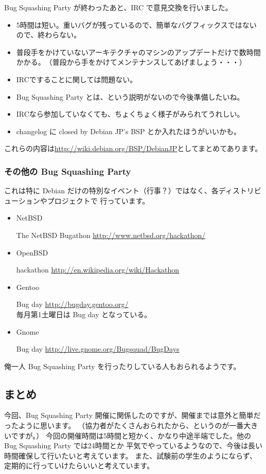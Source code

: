 \documentclass[mingoth,a4paper]{jsarticle}
\begin{document}
 Bug Squashing Party が終わったあと、IRC で意見交換を行いました。

\begin{itemize}

    \item 5時間は短い。重いバグが残っているので、簡単なバグフィックスではないので、終わらない。
    \item 普段手をかけていないアーキテクチャのマシンのアップデートだけで数時間かかる。　（普段から手をかけてメンテナンスしてあげましょう・・・）
    \item IRCですることに関しては問題ない。
    \item Bug Squashing Party とは、という説明がないので今後準備したいね。
    \item IRCなら参加していなくても、ちょくちょく様子がみられてうれしい。
    \item changelog に closed by Debian JP's BSP とか入れたほうがいいかも。

\end{itemize}

 これらの内容は\url{http://wiki.debian.org/BSP/DebianJP}としてまとめてあります。

\subsubsection{その他の Bug Squashing Party}
これは特に Debian だけの特別なイベント（行事？）ではなく、各ディストリビューションやプロジェクトで
行っています。
\begin{itemize}
	\item NetBSD
		
		The NetBSD Bugathon \url{http://www.netbsd.org/hackathon/} 
	\item OpenBSD

		hackathon \url{http://en.wikipedia.org/wiki/Hackathon}
	\item Gentoo

		Bug day \url{http://bugday.gentoo.org/} \\
		毎月第1土曜日は Bug day となっている。
	\item Gnome 

		Bug day \url{http://live.gnome.org/Bugsquad/BugDays}
\end{itemize}

俺一人 Bug Squashing Party を行ったりしている人もおられるようです。

\subsection{まとめ}
 今回、Bug Squashing Party 開催に関係したのですが、開催までは意外と簡単だったように思います。
 （協力者がたくさんおられたから、というのが一番大きいですが。）
 今回の開催時間は5時間と短かく、かなり中途半端でした。他の Bug Squashing Party では24時間とか
 平気でやっているようなので、今後は長い時間確保して行いたいと考えています。
 また、試験前の学生のようにならず、定期的に行っていけたらいいと考えています。
\end{document}
